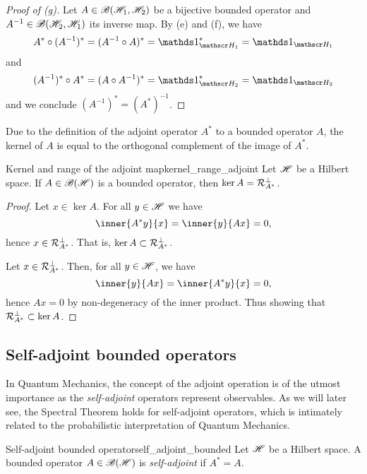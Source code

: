\begin{proof}[Proof of (g)]
    Let \(A \in \mathscr{B}(\mathscr{H}_1, \mathscr{H}_2)\) be a bijective bounded operator and \(A^{-1} \in \mathscr{B}(\mathscr{H}_2, \mathscr{H}_1)\) its inverse map. By (e) and (f), we have
    \begin{equation*}
        A^* \circ (A^{-1})^* = (A^{-1} \circ A)^* = \unity_{\hilbert_1}^* = \unity_{\hilbert_1}
    \end{equation*}
    and
    \begin{equation*}
        (A^{-1})^* \circ A^* = (A \circ A^{-1})^* = \unity_{\hilbert_2}^* = \unity_{\hilbert_2}
    \end{equation*}
    and we conclude \((A^{-1})^* = (A^*)^{-1}\).
\end{proof}

Due to the definition of the adjoint operator \(A^*\) to a bounded operator \(A\), the kernel of \(A\) is equal to the orthogonal complement of the image of \(A^*\).
\begin{proposition}{Kernel and range of the adjoint map}{kernel_range_adjoint}
    Let \(\mathscr{H}\) be a Hilbert space. If \(A \in \mathscr{B}(\mathscr{H})\) is a bounded operator, then \(\ker A = \mathcal{R}_{A^{\ast}}^\perp\).
\end{proposition}
\begin{proof}
    Let \(x \in \ker A\). For all \(y \in \mathscr{H}\) we have
    \begin{equation*}
        \inner{A ^{\ast}y}{x} = \inner{y}{Ax} = 0,
    \end{equation*}
    hence \(x \in \mathcal{R}_{A ^{\ast}}^\perp\). That is, \(\ker A \subset \mathcal{R}_{A ^{\ast}}^\perp\).

    Let \(x \in \mathcal{R}_{A ^{\ast}}^\perp\). Then, for all \(y \in \mathscr{H}\), we have
    \begin{equation*}
        \inner{y}{Ax} = \inner{A ^{\ast}y}{x} = 0,
    \end{equation*}
    hence \(Ax = 0\) by non-degeneracy of the inner product. Thus showing that \(\mathcal{R}_{A ^{\ast}}^\perp \subset \ker A\).
\end{proof}

\subsection{Self-adjoint bounded operators}
In Quantum Mechanics, the concept of the adjoint operation is of the utmost importance as the \emph{self-adjoint} operators represent observables. As we will later see, the Spectral Theorem holds for self-adjoint operators, which is intimately related to the probabilistic interpretation of Quantum Mechanics.
\begin{definition}{Self-adjoint bounded operator}{self_adjoint_bounded}
    Let \(\mathscr{H}\) be a Hilbert space. A bounded operator \(A \in \mathscr{B}(\mathscr{H})\) is \emph{self-adjoint} if \(A^{\ast} = A\).
\end{definition}

